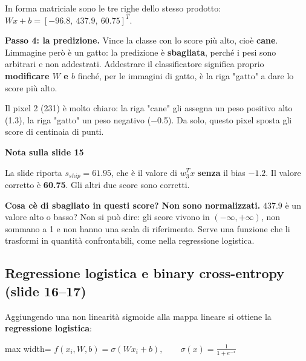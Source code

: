 \documentclass[11pt,a4paper,oneside,openany]{book}
\renewenvironment{quote}{\list{}{\leftmargin=1em\rightmargin=0pt}\item\relax}{\endlist}
\begin{document}
In forma matriciale sono le tre righe dello stesso prodotto: \(Wx + b = [-96.8,\ 437.9,\ 60.75]^T\).

\textbf{Passo 4: la predizione.} Vince la classe con lo score più alto, cioè \textbf{cane}. L\textquotesingle immagine però è un gatto: la predizione è \textbf{sbagliata}, perché i pesi sono arbitrari e non addestrati. Addestrare il classificatore significa proprio \textbf{modificare \(W\) e \(b\)} finché, per le immagini di gatto, è la riga "gatto" a dare lo score più alto.

Il pixel 2 (231) è molto chiaro: la riga "cane" gli assegna un peso positivo alto (1.3), la riga "gatto" un peso negativo (−0.5). Da solo, questo pixel sposta gli score di centinaia di punti.

\begin{quote}
\textbf{Nota sulla slide 15}
\end{quote}

\begin{quote}
La slide riporta \(s_{ship} = 61.95\), che è il valore di \(w_3^T x\) \textbf{senza} il bias \(-1.2\). Il valore corretto è \textbf{60.75}. Gli altri due score sono corretti.
\end{quote}

\textbf{Cosa c\textquotesingle è di sbagliato in questi score?} \textbf{Non sono normalizzati.} \(437.9\) è un valore alto o basso? Non si può dire: gli score vivono in \((-\infty, +\infty)\), non sommano a 1 e non hanno una scala di riferimento. Serve una funzione che li trasformi in quantità confrontabili, come nella regressione logistica.

\subsection{Regressione logistica e binary cross-entropy (slide 16--17)}\label{f01-r196}

Aggiungendo una non linearità sigmoide alla mappa lineare si ottiene la \textbf{regressione logistica}:

\begin{center}
\begin{adjustbox}{max width=\linewidth}
$\displaystyle 
f(x_i, W, b) = \sigma(Wx_i + b), \qquad \sigma(x) = \frac{1}{1+e^{-x}}
$
\end{adjustbox}
\end{center}
\end{document}
